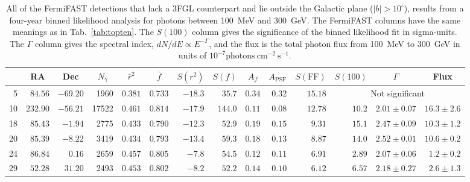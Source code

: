 \documentclass[useAMS,usenatbib]{mn2e}
\begin{document}
\begin{table}
  \caption{ All of the FermiFAST detections that lack a 3FGL
    counterpart and lie outside the Galactic plane ($|b|>10^{\circ}$),
    results from a four-year binned likelihood analysis for photons
    between 100~MeV and 300~GeV.  The FermiFAST columns have the same
    meanings as in Tab.~\ref{tab:topten}. The $S(100)$ column gives
    the significance of the binned likelihood fit in sigma-units.  The
    $\Gamma$ column gives the spectral index, $dN/dE \propto E^{-\Gamma}$,
    and the flux is the total photon flux from 100~MeV to 300~GeV in units
  of $10^{-7}\mathrm{photons}~\mathrm{cm}^{-2}~\mathrm{s}^{-1}$.}
  \label{tab:fermisig100MeV}
\begin{tabular}{rrrrrrrrrrrrrr}
    \hline
    \multicolumn{1}{c}{} & \multicolumn{1}{c}{RA} & \multicolumn{1}{c}{Dec}  & \multicolumn{1}{c}{$N_\gamma$}  &\multicolumn{1}{c}{$\bar r^2$} & \multicolumn{1}{c}{$\bar f$} & \multicolumn{1}{c}{$S(r^2)$} & \multicolumn{1}{c}{$S(f)$} & \multicolumn{1}{c}{$A_f$}  & \multicolumn{1}{c}{$A_\mathrm{PSF}$} & \multicolumn{1}{c}{$S(\mathrm{FF})$} & \multicolumn{1}{c}{$S(100)$}  & \multicolumn{1}{c}{$\Gamma$}  & \multicolumn{1}{c}{Flux}
 \\
 \hline
 5 & $ 84.56$ & $-69.20$ &   1960 & $0.381$ & $0.733$ & $ -18.3$ & $  35.7$ & $0.34$  & $0.32$ & $    15.18$ & \multicolumn{3}{c}{Not significant}  \\
10 & $232.90$ & $-56.21$ &  17522 & $0.461$ & $0.814$ & $ -17.9$ & $ 144.0$ & $0.11$  & $0.08$ & $    12.78$ & $10.2$ & $2.01\pm0.07$ & $16.3\pm2.6$\\
18 & $ 85.43$ & $ -1.94$ &   2775 & $0.433$ & $0.790$ & $ -12.3$ & $  52.9$ & $0.19$  & $0.15$ & $     9.31$ & $15.1$ & $2.47\pm0.09$ & $10.3\pm1.2$\\
20 & $ 85.39$ & $ -8.22$ &   3419 & $0.434$ & $0.793$ & $ -13.4$ & $  59.3$ & $0.18$  & $0.13$ & $     8.87$ & $14.0$ & $2.52\pm0.01$ & $10.6\pm0.2$\\ 
24 & $ 86.84$ & $  0.16$ &   2659 & $0.457$ & $0.805$ & $  -7.8$ & $  54.5$ & $0.12$  & $0.11$ & $     6.91$ & $2.89$  & $2.07\pm0.06$ & $1.2\pm0.2$\\
29 & $ 52.28$ & $ 31.20$ &   2493 & $0.453$ & $0.802$ & $  -8.2$ & $  52.2$ & $0.14$  & $0.10$ & $     6.12$ & $6.57$ & $2.18\pm0.27$ & $2.6\pm1.3$ \\ 

\end{tabular}
\end{table}
\end{document}
